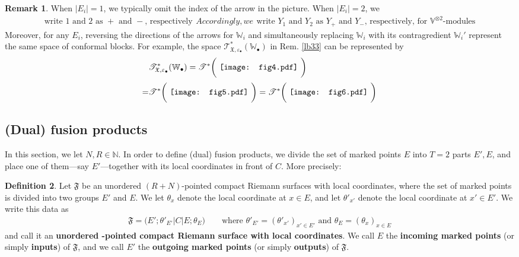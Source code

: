 \documentclass[11pt,b5paper,notitlepage]{article}
\theoremstyle{definition}
\newtheorem{df}{Definition}[section]
\newtheorem{rem}[df]{Remark}
\theoremstyle{plain}
\newcommand{\fk}{\mathfrak}
\newcommand{\blt}{\bullet}
\newcommand{\Vbb}{\mathbb V}
\newcommand{\Wbb}{\mathbb W}
\newcommand{\Nbb}{\mathbb N}
\newcommand{\<}{\left\langle}
\renewcommand{\>}{\right\rangle}
\newcommand{\fx}{\mathfrak{X}}
\newcommand{\ST}{\mathscr{T}}
\newcommand{\eps}{\varepsilon}
\newcommand{\ff}{\mathfrak{F}}
\numberwithin{equation}{section}
\begin{document}
\begin{rem}\label{lb84}
When $|E_i|=1$, we typically omit the index of the arrow in the picture. When $|E_i|=2$, we 
\begin{subequations}
\begin{align}
\text{write $1$ and $2$ as $+$ and $-$, respectively}
\end{align} 
Accordingly, we
\begin{align}
\text{write $Y_1$ and $Y_2$ as $Y_+$ and $Y_-$, respectively, for $\Vbb^{\otimes 2}$-modules}
\end{align}
\end{subequations}
Moreover, for any $E_i$, reversing the directions of the arrows for $\Wbb_i$ and simultaneously replacing $\Wbb_i$ with its contragredient $\Wbb_i'$ represent the same space of conformal blocks. For example, the space $\ST^*_{\fx,\eps_\blt}(\Wbb_\blt)$ in Rem. \ref{lb33} can be represented by
\begin{align*}
&\ST^*_{\fx,\eps_\blt}(\Wbb_\blt)=\ST^*\bigg(\vcenter{\hbox{{
		 \texttt{[image: fig4.pdf]}}}}~  \bigg)\\[0.5ex]
=&\ST^*\bigg(\vcenter{\hbox{{
		 \texttt{[image: fig5.pdf]}}}}~  \bigg)=\ST^*\bigg(\vcenter{\hbox{{
		 \texttt{[image: fig6.pdf]}}}}~  \bigg)
\end{align*}
\end{rem}



 
	\subsection{(Dual) fusion products}

In this section, we let $N,R\in\Nbb$. In order to define (dual) fusion products, we divide the set of marked points $E$ into $T=2$ parts $E',E$, and place one of them---say $E'$---together with its local coordinates in front of $C$. More precisely:

\begin{df}\label{lb1}
Let $\ff$ be an unordered $(R+N)$-pointed compact Riemann surfaces with local coordinates, where the set of marked points is divided into two groups $E'$ and $E$. We let $\theta_x$ denote the local coordinate at $x\in E$, and let $\theta'_{x'}$ denote the local coordinate at $x'\in E'$. We write this data as
\begin{align}\label{eq13}
\fk F=\big(E'; \theta'_{E'}\big|C\big|E;\theta_E\big)\qquad\text{where }\theta'_{E'}=(\theta'_{x'})_{x'\in E'}\text{ and }\theta_E=(\theta_x)_{x\in E}
\end{align}
and call it an \textbf{unordered -pointed compact Riemann surface with local coordinates}. We call $E$ the \textbf{incoming marked points} (or simply \textbf{inputs}) of $\fk F$, and we call $E'$ the \textbf{outgoing marked points} (or simply \textbf{outputs}) of $\fk F$.
\end{df}
\end{document}
